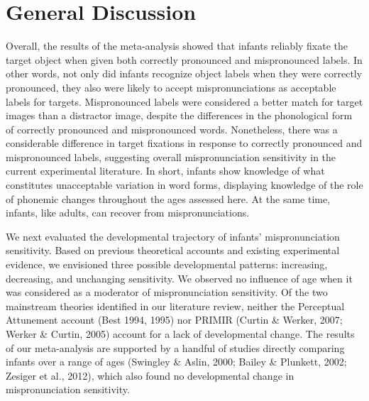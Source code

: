 \documentclass[man]{apa6}
\theoremstyle{definition}
\theoremstyle{definition}
\theoremstyle{definition}
\theoremstyle{remark}
\begin{document}
\section{General Discussion}\label{general-discussion}

Overall, the results of the meta-analysis showed that infants reliably
fixate the target object when given both correctly pronounced and
mispronounced labels. In other words, not only did infants recognize
object labels when they were correctly pronounced, they also were likely
to accept mispronunciations as acceptable labels for targets.
Mispronounced labels were considered a better match for target images
than a distractor image, despite the differences in the phonological
form of correctly pronounced and mispronounced words. Nonetheless, there
was a considerable difference in target fixations in response to
correctly pronounced and mispronounced labels, suggesting overall
mispronunciation sensitivity in the current experimental literature. In
short, infants show knowledge of what constitutes unacceptable variation
in word forms, displaying knowledge of the role of phonemic changes
throughout the ages assessed here. At the same time, infants, like
adults, can recover from mispronunciations.

We next evaluated the developmental trajectory of infants'
mispronunciation sensitivity. Based on previous theoretical accounts and
existing experimental evidence, we envisioned three possible
developmental patterns: increasing, decreasing, and unchanging
sensitivity. We observed no influence of age when it was considered as a
moderator of mispronunciation sensitivity. Of the two mainstream
theories identified in our literature review, neither the Perceptual
Attunement account (Best 1994, 1995) nor PRIMIR (Curtin \& Werker, 2007;
Werker \& Curtin, 2005) account for a lack of developmental change. The
results of our meta-analysis are supported by a handful of studies
directly comparing infants over a range of ages (Swingley \& Aslin,
2000; Bailey \& Plunkett, 2002; Zesiger et al., 2012), which also found
no developmental change in mispronunciation sensitivity.
\end{document}

